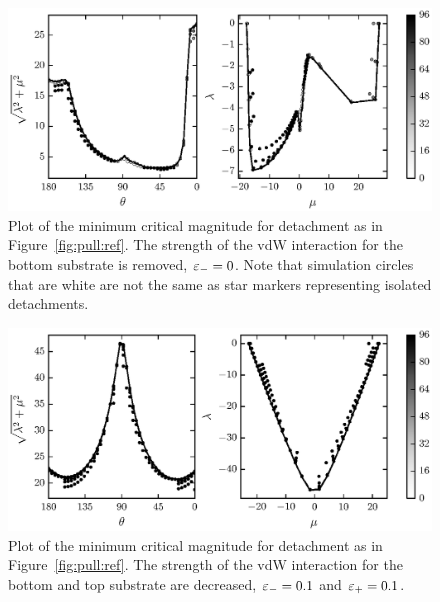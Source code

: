 	\begin{figure}
		\begin{center}
			\includegraphics{./fig/ch3/pull/eb0/grid.eps}
		\end{center}		
		\caption{Plot of the minimum critical magnitude for detachment as in Figure~\ref{fig:pull:ref}. The strength of the vdW interaction for the bottom substrate is removed, $\varepsilon_-=0$. Note that simulation circles that are white are not the same as star markers representing isolated detachments.
		\label{fig:pull:eb0}}
	\end{figure}
	
	\begin{figure}
		\begin{center}
			\includegraphics{./fig/ch3/pull/eb0.1_et0.1/grid.eps}
		\end{center}		
		\caption{Plot of the minimum critical magnitude for detachment as in Figure~\ref{fig:pull:ref}. The strength of the vdW interaction for the bottom and top substrate are decreased, $\varepsilon_-=0.1$ and $\varepsilon_+=0.1$.
		\label{fig:pull:eb0.1_et0.1}}
	\end{figure}
	
